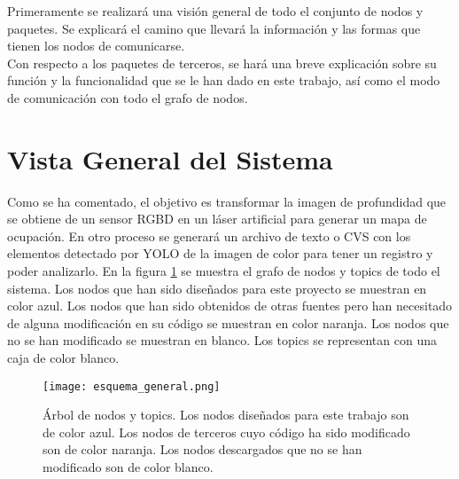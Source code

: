 Primeramente se realizará una visión general de todo el conjunto de nodos y paquetes. Se explicará el camino que llevará la información y las formas que tienen los nodos de comunicarse.\\

Con respecto a los paquetes de terceros, se hará una breve explicación sobre su función y la funcionalidad que se le han dado en este trabajo, así como el modo de comunicación con todo el grafo de nodos.\\

\section{Vista General del Sistema}

Como se ha comentado, el objetivo es transformar la imagen de profundidad que se obtiene de un sensor RGBD en un láser artificial para generar un mapa de ocupación. En otro proceso se generará un archivo de texto o CVS con los elementos detectado por YOLO de la imagen de color para tener un registro y poder analizarlo. En la figura \ref{fig:esq_general} se muestra el grafo de nodos y topics de todo el sistema. Los nodos que han sido diseñados para este proyecto se muestran en color azul. Los nodos que han sido obtenidos de otras fuentes pero han necesitado de alguna modificación en su código se muestran en color naranja. Los nodos que no se han modificado se muestran en blanco. Los topics se representan con una caja de color blanco.\\

\begin{figure}[h]
	\begin{center} 
		\texttt{[image: esquema\_general.png]}
	\end{center}
	\caption{Árbol de nodos y topics. Los nodos diseñados para este trabajo son de color azul. Los nodos de terceros cuyo código ha sido modificado son de color naranja. Los nodos descargados que no se han modificado son de color blanco.}
	\label{fig:esq_general}
\end{figure}

